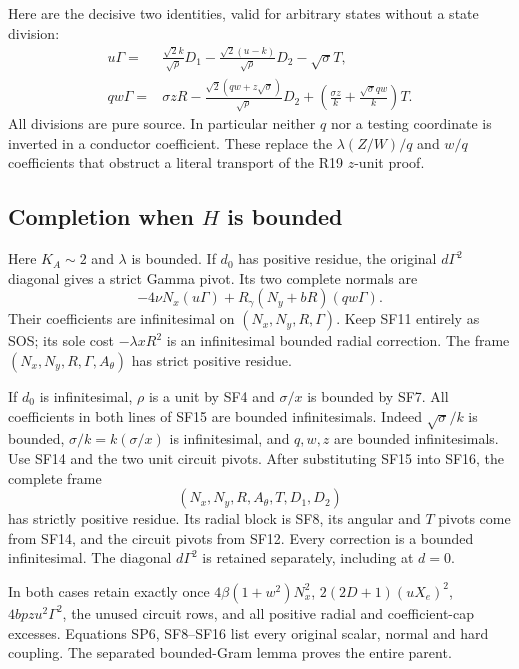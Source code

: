 Here are the decisive two identities, valid for arbitrary states
without a state division:
\[
 \boxed{\begin{aligned}
 u\Gamma={}&\frac{\sqrt2 k}{\sqrt\rho}D_1
       -\frac{\sqrt2(u-k)}{\sqrt\rho}D_2-\sqrt\sigma T,\\
 qw\Gamma={}&\sigma zR
       -\frac{\sqrt2(qw+z\sqrt\sigma)}{\sqrt\rho}D_2
       +\left(\frac{\sigma z}{k}
                  +\frac{\sqrt\sigma qw}{k}\right)T.
 \end{aligned}}
 \tag{SF15}
\]
All divisions are pure source. In particular neither $q$ nor a
testing coordinate is inverted in a conductor coefficient. These
replace the $\lambda(Z/W)/q$ and $w/q$ coefficients that obstruct a
literal transport of the R19 $z$-unit proof.

\subsection{Completion when $H$ is bounded}

Here $K_A\sim2$ and $\lambda$ is bounded. If $d_0$ has positive
residue, the original $d\Gamma^2$ diagonal gives a strict Gamma
pivot. Its two complete normals are
\[
 -4\nu N_x(u\Gamma)
       +R_\gamma(N_y+bR)(qw\Gamma).
 \tag{SF16}
\]
Their coefficients are infinitesimal on $(N_x,N_y,R,\Gamma)$.
Keep SF11 entirely as SOS; its sole cost $-\lambda xR^2$ is an
infinitesimal bounded radial correction. The frame
$(N_x,N_y,R,\Gamma,A_\theta)$ has strict positive residue.

If $d_0$ is infinitesimal, $\rho$ is a unit by SF4 and
$\sigma/x$ is bounded by SF7. All coefficients in both lines of
SF15 are bounded infinitesimals. Indeed $\sqrt\sigma/k$ is
bounded, $\sigma/k=k(\sigma/x)$ is infinitesimal, and $q,w,z$
are bounded infinitesimals. Use SF14 and the two unit circuit
pivots. After substituting SF15 into SF16, the complete frame
\[
 (N_x,N_y,R,A_\theta,T,D_1,D_2)
 \tag{SF17}
\]
has strictly positive residue. Its radial block is SF8, its angular
and $T$ pivots come from SF14, and the circuit pivots from SF12.
Every correction is a bounded infinitesimal. The diagonal
$d\Gamma^2$ is retained separately, including at $d=0$.

In both cases retain exactly once $4\beta(1+w^2)N_x^2$,
$2(2D+1)(uX_e)^2$, $4bpzu^2\Gamma^2$, the unused circuit rows,
and all positive radial and coefficient-cap excesses. Equations
SP6, SF8--SF16 list every original scalar, normal and hard coupling.
The separated bounded-Gram lemma proves the entire parent.

